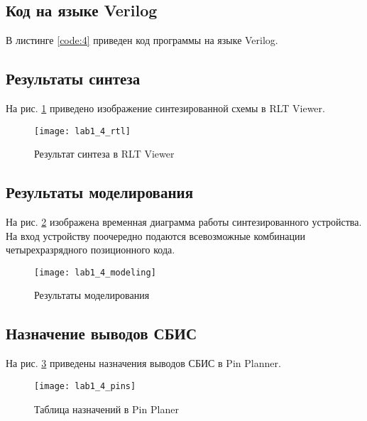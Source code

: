 \subsection{Код на языке Verilog}

В листинге \ref{code:4} приведен код программы на языке Verilog.



\subsection{Результаты синтеза}

На рис. \ref{fig:lab1_4_rtl} приведено изображение синтезированной схемы в RLT Viewer.

\begin{figure}[H]
\begin{center}
	\texttt{[image: lab1\_4\_rtl]}
	\caption{Результат синтеза в RLT Viewer}
	\label{fig:lab1_4_rtl}
\end{center}
\end{figure}

\subsection{Результаты моделирования}
\label{sec:lab1_4_modeling}

На рис. \ref{fig:lab1_4_modeling} изображена временная диаграмма работы синтезированного устройства. На вход устройству поочередно подаются всевозможные комбинации четырехразрядного позиционного кода.
\begin{figure}[H]
\begin{center}
	\texttt{[image: lab1\_4\_modeling]}
	\caption{Результаты моделирования}
	\label{fig:lab1_4_modeling}
\end{center}
\end{figure}

\subsection{Назначение выводов СБИС}

На рис. \ref{fig:lab1_4_pins} приведены назначения выводов СБИС в Pin Planner.

\begin{figure}[H]
\begin{center}
	\texttt{[image: lab1\_4\_pins]}
	\caption{Таблица назначений в Pin Planer}
	\label{fig:lab1_4_pins}
\end{center}
\end{figure}

